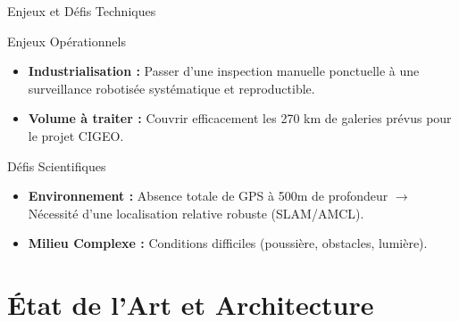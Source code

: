 \documentclass[aspectratio=169]{beamer}
\begin{document}
\begin{frame}{Enjeux et Défis Techniques}
    \begin{block}{Enjeux Opérationnels}
        \begin{itemize}
            \item \textbf{Industrialisation :} Passer d'une inspection manuelle ponctuelle à une surveillance robotisée systématique et reproductible.
            \item \textbf{Volume à traiter :} Couvrir efficacement les 270 km de galeries prévus pour le projet CIGEO.
        \end{itemize}
    \end{block}

    \vspace{0.5cm}

    \begin{block}{Défis Scientifiques}
        \begin{itemize}
            \item \textbf{Environnement :} Absence totale de GPS à 500m de profondeur $\rightarrow$ Nécessité d'une localisation relative robuste (SLAM/AMCL).
            \item \textbf{Milieu Complexe : }Conditions difficiles (poussière, obstacles, lumière).
        \end{itemize}
    \end{block}
\end{frame}

\section{État de l'Art et Architecture}
\end{document}
